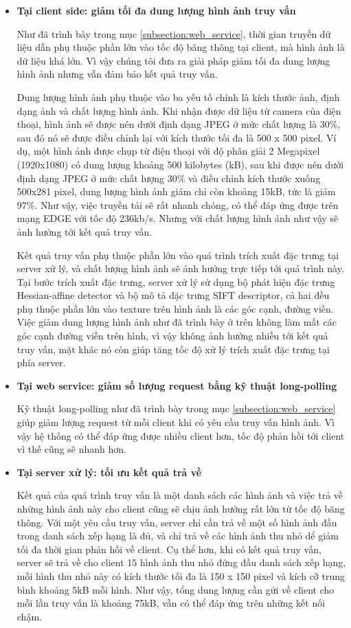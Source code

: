 \begin{itemize}
\item \textbf{Tại client side: giảm tối đa dung lượng hình ảnh truy vấn}

Như đã trình bày trong mục \ref{subsection:web_service}, thời gian truyền dữ liệu dẫn phụ thuộc phần lớn vào tốc độ băng thông tại client, mà hình ảnh là dữ liệu khá lớn. Vì vậy chúng tôi đưa ra giải pháp giảm tối đa dung lượng hình ảnh nhưng vẫn đảm bảo kết quả truy vấn.

Dung lượng hình ảnh phụ thuộc vào ba yếu tố chính là kích thước ảnh, định dạng ảnh và chất lượng hình ảnh. Khi nhận được dữ liệu từ camera của điện thoại, hình ảnh sẽ được nén dưới định dạng JPEG ở mức chất lượng là 30\%, sau đó nó sẽ được điều chỉnh lại với kích thước tối đa là 500 x 500 pixel. Ví dụ, một hình ảnh được chụp từ điện thoại với độ phân giải 2 Megapixel (1920x1080) có dung lượng khoảng 500 kilobytes (kB), sau khi được nén dưới định dạng JPEG ở mức chất lượng 30\% và điều chỉnh kích thước xuống 500x281 pixel, dung lượng hình ảnh giảm chỉ còn khoảng 15kB, tức là giảm 97\%. Như vậy, việc truyền tải sẽ rất nhanh chóng, có thể đáp ứng được trên mạng EDGE với tốc độ 236kb/s. Nhưng với chất lượng hình ảnh như vậy sẽ ảnh hưởng tới kết quả truy vấn.

Kết quả truy vấn phụ thuộc phần lớn vào quá trình trích xuất đặc trưng tại server xử lý, và chất lượng hình ảnh sẽ ảnh hưởng trực tiếp tới quá trình này. Tại bước trích xuất đặc trưng, server xử lý sử dụng bộ phát hiện đặc trưng Hessian-affine detector và bộ mô tả đặc trưng SIFT descriptor, cả hai đều phụ thuộc phần lớn vào texture trên hình ảnh là các góc cạnh, đường viền. Việc giảm dung lượng hình ảnh như đã trình bày ở trên không làm mất các góc cạnh đường viền trên hình, vì vậy không ảnh hưởng nhiều tới kết quả truy vấn, mặt khác nó còn giúp tăng tốc độ xử lý trích xuất đặc trưng tại phía server.

\item \textbf{Tại web service: giảm số lượng request bằng kỹ thuật long-polling}

Kỹ thuật long-polling như đã trình bày trong mục \ref{subsection:web_service} giúp giảm lượng request từ mỗi client khi có yêu cầu truy vấn hình ảnh. Vì vậy hệ thống có thể đáp ứng được nhiều client hơn, tốc độ phản hồi tới client vì thế cũng sẽ nhanh hơn.

\item \textbf{Tại server xử lý: tối ưu kết quả trả về}

Kết quả của quá trình truy vấn là một danh sách các hình ảnh và việc trả về những hình ảnh này cho client cũng sẽ chịu ảnh hưởng rất lớn từ tốc độ băng thông. Với một yêu cầu truy vấn, server chỉ cần trả về một số hình ảnh đầu trong danh sách xếp hạng là đủ, và chỉ trả về các hình ảnh thu nhỏ dể giảm tối đa thời gian phản hồi về client. Cụ thể hơn, khi có kết quả truy vấn, server sẽ trả về cho client 15 hình ảnh thu nhỏ đứng đầu danh sách xếp hạng, mỗi hình thu nhỏ này có kích thước tối đa là 150 x 150 pixel và kích cỡ trung bình khoảng 5kB mỗi hình. Như vậy, tổng dung lượng cần gửi về client cho mỗi lần truy vấn là khoảng 75kB, vẫn có thể đáp ứng trên những kết nối chậm. 


\end{itemize}
